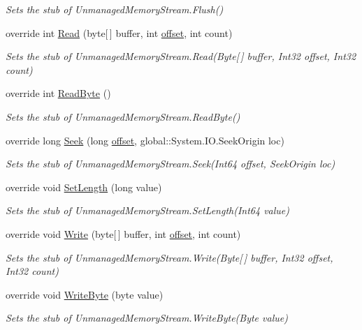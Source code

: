 \begin{DoxyCompactItemize}
\begin{DoxyCompactList}\small\item\em Sets the stub of Unmanaged\-Memory\-Stream.\-Flush()\end{DoxyCompactList}\item 
override int \hyperlink{class_system_1_1_i_o_1_1_fakes_1_1_stub_unmanaged_memory_stream_a9b60a9c391f03eff9ac3f1a291a652b6}{Read} (byte\mbox{[}$\,$\mbox{]} buffer, int \hyperlink{jquery-1_810_82_8js_a4a9f594d20d927164551fc7fa4751a2f}{offset}, int count)
\begin{DoxyCompactList}\small\item\em Sets the stub of Unmanaged\-Memory\-Stream.\-Read(\-Byte\mbox{[}$\,$\mbox{]} buffer, Int32 offset, Int32 count)\end{DoxyCompactList}\item 
override int \hyperlink{class_system_1_1_i_o_1_1_fakes_1_1_stub_unmanaged_memory_stream_ad59553149072edcd8873071f72a56ffc}{Read\-Byte} ()
\begin{DoxyCompactList}\small\item\em Sets the stub of Unmanaged\-Memory\-Stream.\-Read\-Byte()\end{DoxyCompactList}\item 
override long \hyperlink{class_system_1_1_i_o_1_1_fakes_1_1_stub_unmanaged_memory_stream_ab38bde33ef46cb874db59d639e2ae4a3}{Seek} (long \hyperlink{jquery-1_810_82_8js_a4a9f594d20d927164551fc7fa4751a2f}{offset}, global\-::\-System.\-I\-O.\-Seek\-Origin loc)
\begin{DoxyCompactList}\small\item\em Sets the stub of Unmanaged\-Memory\-Stream.\-Seek(\-Int64 offset, Seek\-Origin loc)\end{DoxyCompactList}\item 
override void \hyperlink{class_system_1_1_i_o_1_1_fakes_1_1_stub_unmanaged_memory_stream_a0606c7be939572c60a871aefb35efba6}{Set\-Length} (long value)
\begin{DoxyCompactList}\small\item\em Sets the stub of Unmanaged\-Memory\-Stream.\-Set\-Length(\-Int64 value)\end{DoxyCompactList}\item 
override void \hyperlink{class_system_1_1_i_o_1_1_fakes_1_1_stub_unmanaged_memory_stream_aa22f13c12ffb83a2a3daf52b6381e672}{Write} (byte\mbox{[}$\,$\mbox{]} buffer, int \hyperlink{jquery-1_810_82_8js_a4a9f594d20d927164551fc7fa4751a2f}{offset}, int count)
\begin{DoxyCompactList}\small\item\em Sets the stub of Unmanaged\-Memory\-Stream.\-Write(\-Byte\mbox{[}$\,$\mbox{]} buffer, Int32 offset, Int32 count)\end{DoxyCompactList}\item 
override void \hyperlink{class_system_1_1_i_o_1_1_fakes_1_1_stub_unmanaged_memory_stream_a657f6c10071dc41b7eac8eca0bed5ecc}{Write\-Byte} (byte value)
\begin{DoxyCompactList}\small\item\em Sets the stub of Unmanaged\-Memory\-Stream.\-Write\-Byte(\-Byte value)\end{DoxyCompactList}\end{DoxyCompactItemize}
